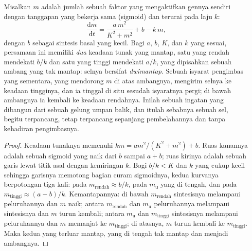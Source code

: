 \begin{theorem}\label{thm:b2:cell-differentiation:switch}
Misalkan $m$ adalah jumlah sebuah faktor yang mengaktifkan gennya
sendiri dengan tanggapan yang bekerja sama (sigmoid) dan terurai pada
laju $k$:
\[
\frac{\mathrm{d}m}{\mathrm{d}t} = \frac{a\,m^{2}}{K^{2} + m^{2}} + b - k\,m,
\]
dengan $b$ sebagai sintesis basal yang kecil. Bagi $a$, $b$, $K$, dan
$k$ yang sesuai, persamaan ini memiliki \emph{dua} keadaan tunak yang
mantap, satu yang rendah mendekati $b/k$ dan satu yang tinggi mendekati
$a/k$, yang dipisahkan sebuah ambang yang tak mantap: selnya bersifat
\emph{dwimantap}. Sebuah isyarat pengimbas yang sementara, yang
mendorong $m$ di atas ambangnya, mengirim selnya ke keadaan tingginya,
dan ia tinggal di situ sesudah isyaratnya pergi; di bawah ambangnya ia
kembali ke keadaan rendahnya. Inilah sebuah ingatan yang dibangun dari
sebuah gelung umpan balik, dan itulah sebabnya sebuah sel, begitu
terpancang, tetap terpancang sepanjang pembelahannya dan tanpa
kehadiran pengimbasnya.
\end{theorem}
\begin{proof}
Keadaan tunaknya memenuhi $k m = a m^{2}/(K^{2} + m^{2}) + b$. Ruas
kanannya adalah sebuah sigmoid yang naik dari $b$ sampai $a + b$; ruas
kirinya adalah sebuah garis lewat titik asal dengan kemiringan $k$.
Bagi $b/k < K$ dan $k$ yang cukup kecil sehingga garisnya memotong
bagian curam sigmoidnya, kedua kurvanya berpotongan tiga kali: pada
$m_{\text{rendah}} \approx b/k$, pada $m_{\text{u}}$ yang di tengah,
dan pada $m_{\text{tinggi}} \approx (a +
b)/k$. Kemantapannya: di bawah
$m_{\text{rendah}}$ sintesisnya melampaui peluruhannya dan $m$ naik;
antara $m_{\text{rendah}}$ dan $m_{\text{u}}$ peluruhannya melampaui
sintesisnya dan $m$ turun kembali; antara $m_{\text{u}}$ dan
$m_{\text{tinggi}}$ sintesisnya melampaui peluruhannya dan $m$ memanjat
ke $m_{\text{tinggi}}$; di atasnya, $m$ turun kembali ke
$m_{\text{tinggi}}$. Maka kedua yang terluar mantap, yang di tengah tak
mantap dan menjadi ambangnya.
\end{proof}

